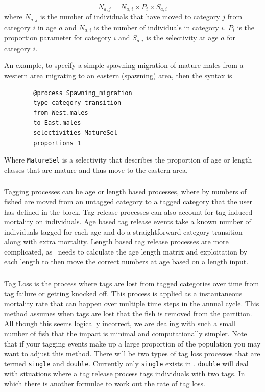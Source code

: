 \begin{equation}
	N_{a,j} = N_{a,i} \times P_i \times S_{a,i}
\end{equation}
where $N_{a,j}$ is the number of individuals that have moved to category $j$ from category $i$ in age $a$ and $N_{a,i}$ is the number of individuals in category $i$. $P_i$ is the proportion parameter for category $i$ and $S_{a,i}$ is the selectivity at age $a$ for category $i$.

An example, to specify a simple spawning migration of mature males from a western area migrating to an eastern (spawning) area, then the syntax is
{\small{\begin{verbatim}
		@process Spawning_migration
		type category_transition 
		from West.males	
		to East.males	
		selectivities MatureSel
		proportions 1
		\end{verbatim}}}

Where \texttt{MatureSel} is a selectivity that describes the proportion of age or length classes that are mature and thus move to the eastern area.

\subsubsection{}\label{sub:tag_release}

Tagging processes can be age or length based processes, where by numbers of fished are moved from an untagged category to a tagged category that the user has defined in the  block. Tag release processes can also account for tag induced mortality on individuals. Age based tag release events take a known number of individuals tagged for each age and do a straightforward category transition along with extra mortality. Length based tag release processes are more complicated, as \CNAME\ needs to calculate the age length matrix and exploitation by each length to then move the correct numbers at age based on a length input. 

\subsubsection{}

Tag Loss is the process where tags are lost from tagged categories over time from tag failure or getting knocked off. This process is applied as a instantaneous mortality rate that can happen over multiple time steps in the annual cycle. This method assumes when tags are lost that the fish is removed from the partition. All though this seems logically incorrect, we are dealing with such a small number of fish that the impact is minimal and computationally simpler. Note that if your tagging events make up a large proportion of the population you may want to adjust this method. There will be two types of tag loss processes that are termed \texttt{single} and \texttt{double}. Currently only \texttt{single} exists in \CNAME. \texttt{double} will deal with situations where a tag release process tags individuals with two tags. In which there is another formulae to work out the rate of tag loss.

